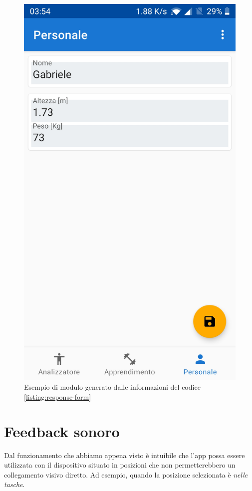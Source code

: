 \begin{figure}[H]
    \centering
    \includegraphics[scale = 0.1019]{assets/images/screenshots/3b_Layout_from_code.jpg}    
    \caption{Esempio di modulo generato dalle informazioni del codice \ref{listing:response-form}}
    \label{fig:screenshot_layout_from_code}
\end{figure}


\newpage
\section{Feedback sonoro}
Dal funzionamento che abbiamo appena visto è intuibile che l'app possa essere utilizzata con il dispositivo situato in posizioni che non permetterebbero
un collegamento visivo diretto. Ad esempio, quando la posizione selezionata è \textit{nelle tasche}.

